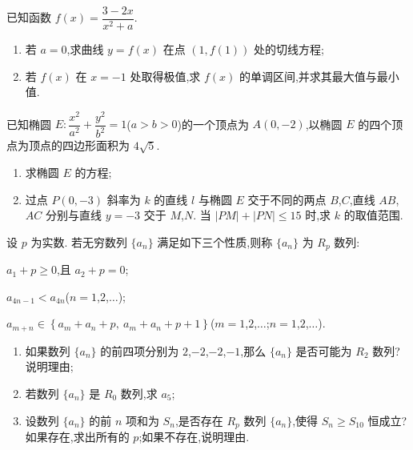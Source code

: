 \begin{problem}
已知函数 \(f(x)=\dfrac{3-2x}{x^2+a}\).

\begin{enumerate}
    \item 若 \(a=0\),求曲线 \(y=f(x)\) 在点 \((1,f(1))\) 处的切线方程;
    \item 若 \(f(x)\) 在 \(x=-1\) 处取得极值,求 \(f(x)\) 的单调区间,并求其最大值与最小值.
\end{enumerate}
\end{problem}

\begin{problem}
已知椭圆 \(E:\dfrac{x^2}{a^2}+\dfrac{y^2}{b^2}=1\)(\(a>b>0\))的一个顶点为 \(A(0,-2)\),以椭圆 \(E\) 的四个顶点为顶点的四边形面积为 \(4\sqrt5\).

\begin{enumerate}
    \item 求椭圆 \(E\) 的方程;
    \item 过点 \(P(0,-3)\) 斜率为 \(k\) 的直线 \(l\) 与椭圆 \(E\) 交于不同的两点 \(B\),\(C\),直线 \(AB\),\(AC\) 分别与直线 \(y=-3\) 交于 \(M\),\(N\). 当 \(|PM|+|PN|\le15\) 时,求 \(k\) 的取值范围.
\end{enumerate}
\end{problem}

\begin{problem}
设 \(p\) 为实数. 若无穷数列 \(\{a_n\}\) 满足如下三个性质,则称 \(\{a_n\}\) 为 \(R_p\) 数列:

\begin{circlelist}
\item \(a_1+p\ge0\),且 \(a_2+p=0\);

\item \(a_{4n-1}<a_{4n}\)(\(n=1\),\(2\),\(\ldots\));

\item \(a_{m+n}\in\left\{a_m+a_n+p,\ a_m+a_n+p+1\right\}\)(\(m=1\),\(2\),\(\ldots\);\(n=1\),\(2\),\(\ldots\)).
\end{circlelist}

\begin{enumerate}
    \item 如果数列 \(\{a_n\}\) 的前四项分别为 \(2\),\(-2\),\(-2\),\(-1\),那么 \(\{a_n\}\) 是否可能为 \(R_2\) 数列?说明理由;
    \item 若数列 \(\{a_n\}\) 是 \(R_0\) 数列,求 \(a_5\);
    \item 设数列 \(\{a_n\}\) 的前 \(n\) 项和为 \(S_n\),是否存在 \(R_p\) 数列 \(\{a_n\}\),使得 \(S_n\ge S_{10}\) 恒成立?如果存在,求出所有的 \(p\);如果不存在,说明理由.
\end{enumerate}
\end{problem}

